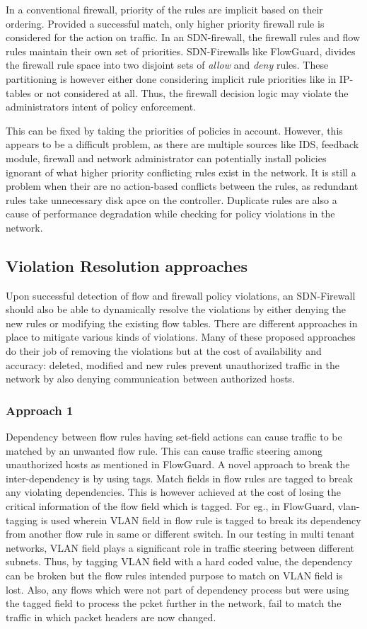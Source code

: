 In a conventional firewall, priority of the rules are implicit based on their ordering. Provided a successful match, only higher priority firewall rule is considered for the action on traffic. In an SDN-firewall, the firewall rules and flow rules maintain their own set of priorities. SDN-Firewalls like FlowGuard, divides the firewall rule space into two disjoint sets of \textit{allow} and \textit{deny} rules. These partitioning is however either done considering implicit rule priorities like in IP-tables or not considered at all. Thus, the firewall decision logic may violate the administrators intent of policy enforcement.

This can be fixed by taking the priorities of policies in account. However, this appears to be a difficult problem, as there are multiple sources like IDS, feedback module, firewall and network administrator can potentially install policies ignorant of what higher priority conflicting rules exist in the network. It is still a problem when their are no action-based conflicts between the rules, as redundant rules take unnecessary disk apce on the controller. Duplicate rules are also a cause of performance degradation while checking for policy violations in the network. 

\subsection{Violation Resolution approaches}
 Upon successful detection of flow and firewall policy violations, an SDN-Firewall should also be able to dynamically resolve the violations by either denying the new rules or modifying the existing flow tables. There are different approaches in place to mitigate various kinds of violations. Many of these proposed approaches do their job of removing the violations but at the cost of availability and accuracy: deleted, modified and new rules prevent unauthorized traffic in the network by also denying communication between authorized hosts.
	\subsubsection{Approach 1}
 	 Dependency between flow rules having set-field actions can cause traffic to be matched by an unwanted flow rule. This can cause traffic steering among unauthorized hosts as mentioned in FlowGuard. A novel approach to break the inter-dependency is by using tags. Match fields in flow rules are tagged to break any violating dependencies. This is however achieved at the cost of losing the critical information of the flow field which is tagged. For eg., in FlowGuard, vlan-tagging is used wherein VLAN field in flow rule is tagged to break its dependency from another flow rule in same or different switch. In our testing in multi tenant networks, VLAN field plays a significant role in traffic steering between different subnets. Thus, by tagging VLAN field with a hard coded value, the dependency can be broken but the flow rules intended purpose to match on VLAN field is lost. Also, any flows which were not part of dependency process but were using the tagged field to process the pcket further in the network, fail to match the traffic in which packet headers are now changed. 
